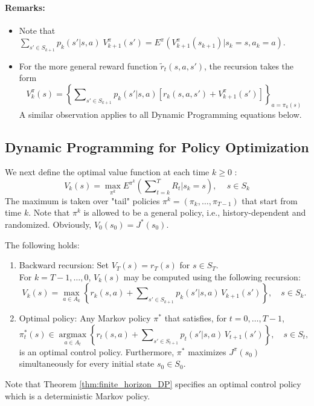 \paragraph{Remarks:}
\begin{itemize}
  \item Note that $\sum\nolimits_{s' \in {S_{k + 1}}} {{p_k}(s'|s,a)} \;V_{k + 1}^\pi (s') = {E^\pi }(V_{k + 1}^\pi ({s_{k + 1}})|{s_k} = s,{a_k} = a)$.
  \item For the more general reward function ${\tilde r_t}(s,a,s')$, the recursion takes the form
                     \[V_k^\pi (s) = {\left\{ {\sum\nolimits_{s' \in {S_{k + 1}}} {{p_k}(s'|s,a)} [{r_k}(s,a,s') + V_{k + 1}^\pi (s')]} \right\}_{a = {\pi _k}(s)}}\]
A similar observation applies to all Dynamic Programming equations below.
\end{itemize}

\subsection{Dynamic Programming for Policy Optimization}

We next define the optimal value function at each time $k \ge 0$ :
\[V_k^{}(s) = \mathop {\max }\limits_{{\pi ^k}} {E^{{\pi ^k}}}\left( {\sum\nolimits_{t = k}^T {{R_t}|{s_k} = s} } \right),\quad \,s \in {S_k}\]
The maximum is taken over "tail" policies ${\pi ^k} = ({\pi _k}, \ldots ,{\pi _{T - 1}})$ that start from time $k$. Note that ${\pi ^k}$ is allowed to be a general policy, i.e., history-dependent and randomized.
Obviously, ${V_0}({s_0}) = {J^*}({s_0})$.

\begin{theorem}\label{thm:finite_horizon_DP}
The following holds:
\begin{enumerate}
\item Backward recursion:  Set $V_T^{}(s) = {r_T}(s)$ for $s \in {S_T}$.\\
     For $k = T - 1, \ldots ,0$, $V_k^{}(s)$ may be computed using the following recursion:
\[V_k^{}(s) = \mathop {\max }\limits_{a \in {A_k}} \left\{ {{r_k}(s,a) + \sum\nolimits_{s' \in {S_{k + 1}}} {{p_k}(s'|s,a)\,} V_{k + 1}^{}(s')} \right\},  \quad  s \in {S_k}.\]
\item Optimal policy: Any Markov policy ${\pi ^*}$ that satisfies, for $t = 0, \ldots ,T - 1$,
\[\pi _t^*(s) \in \mathop {\arg \max }\limits_{a \in {A_t}} \left\{ {{r_t}(s,a) + \sum\nolimits_{s' \in {S_{t + 1}}} {{p_t}(s'|s,a)\,} V_{t + 1}^{}(s')} \right\},\quad s \in {S_t},\]
is an optimal control policy. Furthermore, ${\pi ^*}$ maximizes ${J^\pi }({s_0})$ simultaneously
for every initial state ${s_0} \in {S_0}.$
\end{enumerate}
\end{theorem}
Note that Theorem \ref{thm:finite_horizon_DP} specifies an optimal control policy which is a deterministic Markov policy.

